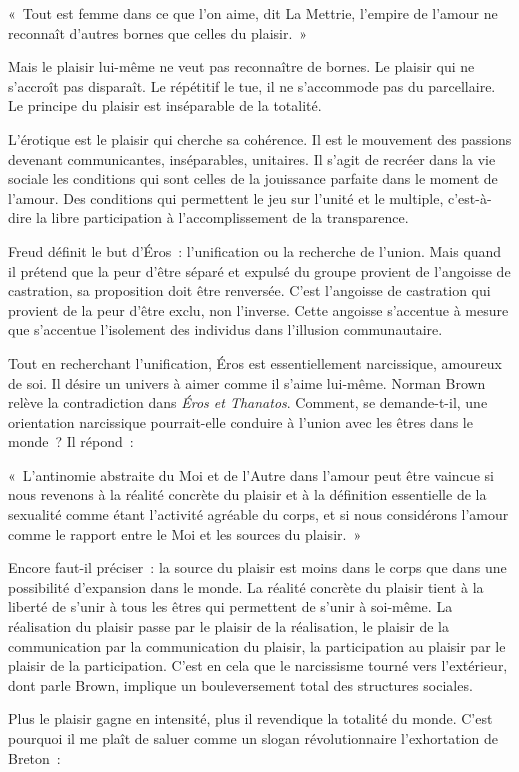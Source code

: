 \documentclass[french,twoside]{book} %
\newenvironment{quoteblock}%
  {\begin{quoting}}
  {\end{quoting}}
\newenvironment{quotebar}{%
    \def\FrameCommand{{\color{rubric!10!}\vrule width 0.5em} \hspace{0.9em}}%
    \def\OuterFrameSep{\itemsep} %
    \MakeFramed {\advance\hsize-\width \FrameRestore}
  }%
  {%
    \endMakeFramed
  }
\renewenvironment{quoteblock}%
  {%
    \savenotes
    \setstretch{0.9}
    \normalfont
    \begin{quotebar}
  }
  {%
    \end{quotebar}
    \spewnotes
  }
\begin{document}
\begin{quoteblock}
\noindent « Tout est femme dans ce que l’on aime, dit La Mettrie, l’empire de l’amour ne reconnaît d’autres bornes que celles du plaisir. »\end{quoteblock}

\noindent Mais le plaisir lui-même ne veut pas reconnaître de bornes. Le plaisir qui ne s’accroît pas disparaît. Le répétitif le tue, il ne s’accommode pas du parcellaire. Le principe du plaisir est inséparable de la totalité.\par
L’érotique est le plaisir qui cherche sa cohérence. Il est le mouvement des passions devenant communicantes, inséparables, unitaires. Il s’agit de recréer dans la vie sociale les conditions qui sont celles de la jouissance parfaite dans le moment de l’amour. Des conditions qui permettent le jeu sur l’unité et le multiple, c’est-à-dire la libre participation à l’accomplissement de la transparence.\par
Freud définit le but d’Éros : l’unification ou la recherche de l’union. Mais quand il prétend que la peur d’être séparé et expulsé du groupe provient de l’angoisse de castration, sa proposition doit être renversée. C’est l’angoisse de castration qui provient de la peur d’être exclu, non l’inverse. Cette angoisse s’accentue à mesure que s’accentue l’isolement des individus dans l’illusion communautaire.\par
Tout en recherchant l’unification, Éros est essentiellement narcissique, amoureux de soi. Il désire un univers à aimer comme il s’aime lui-même. Norman Brown relève la contradiction dans \emph{Éros et Thanatos}. Comment, se demande-t-il, une orientation narcissique pourrait-elle conduire à l’union avec les êtres dans le monde ? Il répond :\par

\begin{quoteblock}
\noindent « L’antinomie abstraite du Moi et de l’Autre dans l’amour peut être vaincue si nous revenons à la réalité concrète du plaisir et à la définition essentielle de la sexualité comme étant l’activité agréable du corps, et si nous considérons l’amour comme le rapport entre le Moi et les sources du plaisir. »\end{quoteblock}

\noindent Encore faut-il préciser : la source du plaisir est moins dans le corps que dans une possibilité d’expansion dans le monde. La réalité concrète du plaisir tient à la liberté de s’unir à tous les êtres qui permettent de s’unir à soi-même. La réalisation du plaisir passe par le plaisir de la réalisation, le plaisir de la communication par la communication du plaisir, la participation au plaisir par le plaisir de la participation. C’est en cela que le narcissisme tourné vers l’extérieur, dont parle Brown, implique un bouleversement total des structures sociales.\par
Plus le plaisir gagne en intensité, plus il revendique la totalité du monde. C’est pourquoi il me plaît de saluer comme un slogan révolutionnaire l’exhortation de Breton :\par
\end{document}
